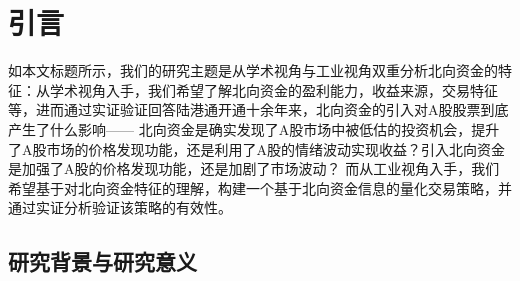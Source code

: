 \documentclass{article}
\begin{document}
\begin{abstract}
On the quantitative strategy side, we address the well-known problem in A-share markets whereby momentum/reversal effects generate spurious alpha due to short-selling constraints and daily price limits. We construct a ``Barra-style'' residualized return target that strips out the linear contributions of market, industry, size, and multi-horizon momentum/reversal factors, ensuring that the resulting alpha is statistically orthogonal to conventional momentum/reversal strategies. Building on this framework, we engineer over twenty features capturing dynamics in northbound capital position changes, and train an incremental rolling ridge regression. Out-of-sample backtests show that the linear model achieves an annualized excess return of approximately 14.5\% and a Sharpe ratio close to 5.0; the autocorrelation structure of the alpha signal closely mirrors the high-frequency trading profile of northbound capital, confirming the internal economic consistency of the strategy. We further test LightGBM and CatBoost nonlinear tree models, finding no significant out-of-sample improvement over the linear baseline under the current signal-to-noise ratio and feature dimensionality constraints, suggesting that the predictable component of alpha is predominantly linear within the existing feature framework.

\textbf{Keywords}: Northbound Capital; Stock Connect; A-Share Market; Return Volatility; Difference-in-Differences; Quantitative Trading Strategy; Momentum/Reversal; Rolling Ridge Regression

\end{abstract}

\newpage

\section{引言}

如本文标题所示，我们的研究主题是从学术视角与工业视角双重分析北向资金的特征：从学术视角入手，我们希望了解北向资金的盈利能力，收益来源，交易特征等，进而通过实证验证回答陆港通开通十余年来，北向资金的引入对A股股票到底产生了什么影响——
北向资金是确实发现了A股市场中被低估的投资机会，提升了A股市场的价格发现功能，还是利用了A股的情绪波动实现收益？引入北向资金是加强了A股的价格发现功能，还是加剧了市场波动？
而从工业视角入手，我们希望基于对北向资金特征的理解，构建一个基于北向资金信息的量化交易策略，并通过实证分析验证该策略的有效性。

\subsection{研究背景与研究意义}
\end{document}
